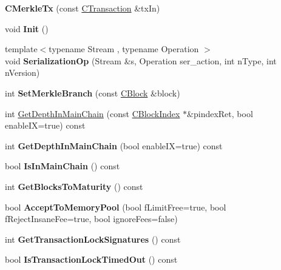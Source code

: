 \begin{DoxyCompactItemize}
\item 
\mbox{\label{class_c_merkle_tx_aaf4aeddb032c6bb34559fa443bfc3476}} 
{\bfseries C\+Merkle\+Tx} (const \mbox{\hyperlink{class_c_transaction}{C\+Transaction}} \&tx\+In)
\item 
\mbox{\label{class_c_merkle_tx_ac57628e321f98642976d06b6cc231162}} 
void {\bfseries Init} ()
\item 
\mbox{\label{class_c_merkle_tx_afefd3a26c9505f1fa81587c19c22f09c}} 
{\footnotesize template$<$typename Stream , typename Operation $>$ }\\void {\bfseries Serialization\+Op} (Stream \&s, Operation ser\+\_\+action, int n\+Type, int n\+Version)
\item 
\mbox{\label{class_c_merkle_tx_a538ba1b6faedbb447cb45ac7019b6f47}} 
int {\bfseries Set\+Merkle\+Branch} (const \mbox{\hyperlink{class_c_block}{C\+Block}} \&block)
\item 
int \mbox{\hyperlink{class_c_merkle_tx_a5bf3a355593ecce5799de92d013149b1}{Get\+Depth\+In\+Main\+Chain}} (const \mbox{\hyperlink{class_c_block_index}{C\+Block\+Index}} $\ast$\&pindex\+Ret, bool enable\+IX=true) const
\item 
\mbox{\label{class_c_merkle_tx_a62f6cd33580ca300867f63ce8f49a072}} 
int {\bfseries Get\+Depth\+In\+Main\+Chain} (bool enable\+IX=true) const
\item 
\mbox{\label{class_c_merkle_tx_ad4b3623fabf1924dba2a7694e3418e1e}} 
bool {\bfseries Is\+In\+Main\+Chain} () const
\item 
\mbox{\label{class_c_merkle_tx_a69ebd437f7b44169659c3527fe73b6ab}} 
int {\bfseries Get\+Blocks\+To\+Maturity} () const
\item 
\mbox{\label{class_c_merkle_tx_a61126e811a53b941b3efdf5a4e83db90}} 
bool {\bfseries Accept\+To\+Memory\+Pool} (bool f\+Limit\+Free=true, bool f\+Reject\+Insane\+Fee=true, bool ignore\+Fees=false)
\item 
\mbox{\label{class_c_merkle_tx_a29ab20d0785095dba254ca1050ba6989}} 
int {\bfseries Get\+Transaction\+Lock\+Signatures} () const
\item 
\mbox{\label{class_c_merkle_tx_a72a7897d620c425280a4af4db87e3601}} 
bool {\bfseries Is\+Transaction\+Lock\+Timed\+Out} () const
\end{DoxyCompactItemize}
